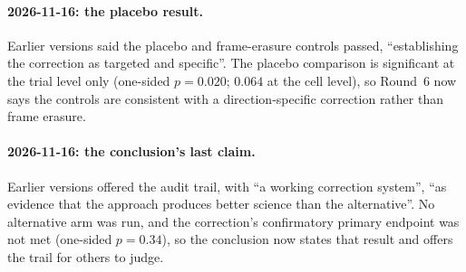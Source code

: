 \documentclass[11pt,letterpaper]{article}
\begin{document}
\paragraph{2026-11-16: the placebo result.} Earlier versions said the placebo and frame-erasure
controls passed, ``establishing the correction as targeted and specific''. The placebo comparison is
significant at the trial level only (one-sided $p=0.020$; $0.064$ at the cell level), so Round~6 now
says the controls are consistent with a direction-specific correction rather than frame erasure.

\paragraph{2026-11-16: the conclusion's last claim.} Earlier versions offered the audit trail, with ``a
working correction system'', ``as evidence that the approach produces better science than the
alternative''. No alternative arm was run, and the correction's confirmatory primary endpoint was not
met (one-sided $p=0.34$), so the conclusion now states that result and offers the trail for others to
judge.


\end{document}
